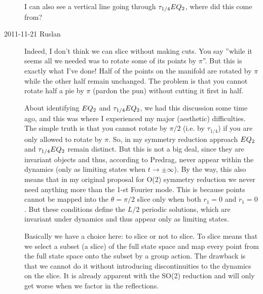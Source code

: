 \begin{description}
I can also see a vertical line going through $\tau_{1/4}EQ_{2}$, where did this
come from?


\item[2011-11-21 Ruslan] Indeed, I don't think we can slice without making cuts.  You say ''while it seems all we needed was to rotate some of its points by $\pi$''.  But this is exactly what I've done!  Half of the points on the manifold are rotated by $\pi$ while the other half remain unchanged.  The problem is that you cannot rotate half a pie by $\pi$ (pardon the pun) without cutting it first in half.

    About identifying $EQ_{2}$ and $\tau_{1/4}EQ_{2}$, we had this discussion some time ago, and this was where I experienced my major (aesthetic) difficulties.  The simple truth is that you cannot rotate by $\pi/2$ (i.e. by $\tau_{1/4}$) if you are only allowed to rotate by $\pi$.  So, in my symmetry reduction approach $EQ_{2}$ and $\tau_{1/4}EQ_{2}$ remain distinct.  But this is not a big deal, since they are invariant objects and thus, according to Predrag, never appear within the dynamics (only as limiting states when $t \to \pm \infty$).
    By the way, this also means that in my original proposal for O(2) symmetry reduction we never need anything more than the 1-st Fourier mode.  This is because points cannot be mapped into the $\theta = \pi/2$ slice only when both $r_1 = 0$ and $\dot{r}_1 = 0$.  But these conditions define the $L/2$ periodic solutions, which are invariant under \KS dynamics and thus appear only as limiting states.

    Basically we have a choice here: to slice or not to slice.  To slice means that we select a subset (a slice) of the full state space and map every point from the full state space onto the subset by a group action.  The drawback is that we cannot do it without introducing discontinuities to the dynamics on the slice.  It is already apparent with the SO(2) reduction and will only get worse when we factor in the reflections.


\end{description}
